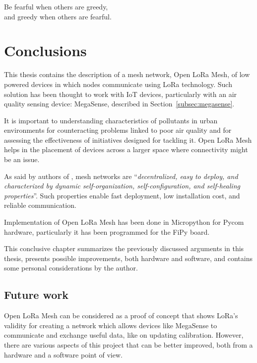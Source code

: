 
\begin{savequote}[70mm]
	Be fearful when others are greedy,\\
	and greedy when others are fearful.
\end{savequote}

\chapter{Conclusions}\label{chapter:conclusions}

	This thesis contains the description of a mesh network, Open LoRa Mesh, of low powered devices in which nodes communicate using LoRa technology.
	Such solution has been thought to work with IoT devices, particularly with an air quality sensing device: MegaSense, described in Section~\ref{subsec:megasense}.
	
	It is important to understanding characteristics of pollutants in urban environments for counteracting problems linked to poor air quality and for assessing the effectiveness of initiatives designed for tackling it.
	Open LoRa Mesh helps in the placement of devices across a larger space where connectivity might be an issue.
	
	As said by authors of \cite{Sampaio-2015}, mesh networks are ``\textit{decentralized, easy to deploy, and characterized by dynamic self-organization, self-configuration, and self-healing properties}''.
	Such properties enable fast deployment, low installation cost, and reliable communication.
		
	Implementation of Open LoRa Mesh has been done in Micropython for Pycom hardware, particularly it has been programmed for the FiPy board.
	
	This conclusive chapter summarizes the previously discussed arguments in this thesis, presents possible improvements, both hardware and software, and contains some personal considerations by the author.

	\section{Future work}
		
		Open LoRa Mesh can be considered as a proof of concept that shows LoRa's validity for creating a network which allows devices like MegaSense to communicate and exchange useful data, like on updating calibration.
		However, there are various aspects of this project that can be better improved, both from a hardware and a software point of view.
	
